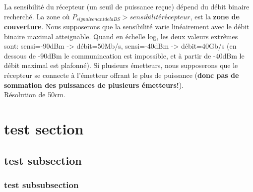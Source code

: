 La sensibilité du récepteur (un seuil de puissance reçue) dépend du débit binaire recherché. La zone où $P_{signal venant de la BS} > sensibilité récepteur$, est la \textbf{zone de couverture}. Nous supposerons que la sensibilité varie linéairement avec le débit binaire maximal atteignable. Quand en échelle log, les deux valeurs extrêmes sont: sensi=-90dBm -> débit=50Mb/s, sensi=-40dBm -> débit=40Gb/s (en dessous de -90dBm le communincation est impossible, et à partir de -40dBm le débit maximal est plafonné). Si plusieurs émetteurs, nous supposerons que le récepteur se connecte à l'émetteur offrant le plus de puissance (\textbf{donc pas de sommation des puissances de plusieurs émetteurs!}).\\

Résolution de 50cm.\\

\section{test section}
\subsection{test subsection}
\subsubsection{test subsubsection}
